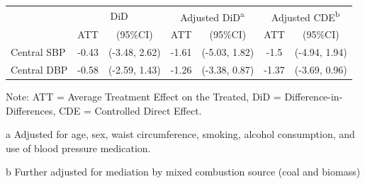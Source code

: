 \documentclass[
  letterpaper,
  DIV=11,
  numbers=noendperiod]{scrartcl}
\makeatletter
\renewenvironment{table}%
   {\renewcommand\familydefault\sfdefault
    \@float{table}}
   {\end@float}
\makeatother
\begin{document}
\begin{table}
\centering
\begin{threeparttable}
\begin{tabular}{lcccccc}
\toprule
\multicolumn{1}{c}{ } & \multicolumn{2}{c}{DiD} & \multicolumn{2}{c}{Adjusted DiD\textsuperscript{a}} & \multicolumn{2}{c}{Adjusted CDE\textsuperscript{b}} \\
\cmidrule(l{3pt}r{3pt}){2-3} \cmidrule(l{3pt}r{3pt}){4-5} \cmidrule(l{3pt}r{3pt}){6-7}
 & ATT & (95\%CI) & ATT & (95\%CI) & ATT & (95\%CI)\\
\midrule
Central SBP & -0.43 & (-3.48, 2.62) & -1.61 & (-5.03, 1.82) & -1.5 & (-4.94, 1.94)\\
Central DBP & -0.58 & (-2.59, 1.43) & -1.26 & (-3.38, 0.87) & -1.37 & (-3.69, 0.96)\\
\bottomrule
\end{tabular}
\begin{tablenotes}
\item \small{Note: ATT = Average Treatment Effect on the Treated, DiD = Difference-in-Differences, CDE = Controlled Direct Effect.}
\item[a] \small{Adjusted for age, sex, waist circumference, smoking, alcohol consumption, and use of blood pressure medication.}
\item[b] \small{Further adjusted for mediation by mixed combustion source (coal and biomass)}
\end{tablenotes}
\end{threeparttable}
\end{table}
\end{document}
